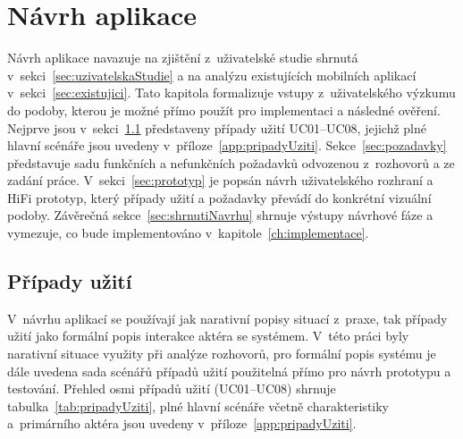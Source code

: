 \chapter{Návrh aplikace}
\label{ch:navrh}

Návrh aplikace navazuje na zjištění z~uživatelské studie shrnutá v~sekci~\ref{sec:uzivatelskaStudie} a na analýzu existujících mobilních aplikací v~sekci~\ref{sec:existujici}.
Tato kapitola formalizuje vstupy z~uživatelského výzkumu do podoby, kterou je možné přímo použít pro implementaci a následné ověření.
Nejprve jsou v~sekci~\ref{sec:pripadyUziti} představeny případy užití UC01--UC08, jejichž plné hlavní scénáře jsou uvedeny v~příloze~\ref{app:pripadyUziti}.
Sekce~\ref{sec:pozadavky} představuje sadu funkčních a nefunkčních požadavků odvozenou z~rozhovorů a ze zadání práce.
V~sekci~\ref{sec:prototyp} je popsán návrh uživatelského rozhraní a HiFi prototyp, který případy užití a požadavky převádí do konkrétní vizuální podoby.
Závěrečná sekce~\ref{sec:shrnutiNavrhu} shrnuje výstupy návrhové fáze a vymezuje, co bude implementováno v~kapitole~\ref{ch:implementace}.

\section{Případy užití}
\label{sec:pripadyUziti}

V~návrhu aplikací se používají jak narativní popisy situací z~praxe, tak případy užití jako formální popis interakce aktéra se systémem.
V~této práci byly narativní situace využity při analýze rozhovorů, pro formální popis systému je dále uvedena sada scénářů případů užití použitelná přímo pro návrh prototypu a testování.
Přehled osmi případů užití (UC01--UC08) shrnuje tabulka~\ref{tab:pripadyUziti}, plné hlavní scénáře včetně charakteristiky a~primárního aktéra jsou uvedeny v~příloze~\ref{app:pripadyUziti}.

